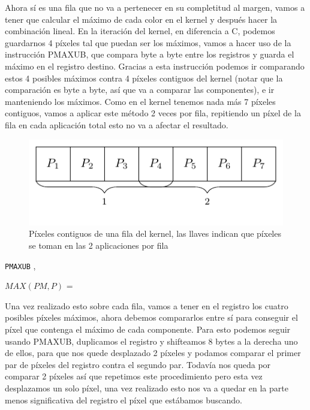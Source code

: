 Ahora sí es una fila que no va a pertenecer en su completitud al margen, vamos a tener que calcular el máximo de cada color en el kernel y después hacer la combinación lineal. En la iteración del kernel, en diferencia a C, podemos guardarnos 4 píxeles tal que puedan ser los máximos, vamos a hacer uso de la instrucción PMAXUB, que compara byte a byte entre los registros y guarda el máximo en el registro destino. Gracias a esta instrucción podemos ir comparando estos 4 posibles máximos contra 4 píxeles contiguos del kernel (notar que la comparación es byte a byte, así que va a comparar las componentes), e ir manteniendo los máximos. Como en el kernel tenemos nada más 7 píxeles contiguos, vamos a aplicar este método 2 veces por fila, repitiendo un píxel de la fila en cada aplicación total esto no va a afectar el resultado.

\begin{figure}[H]
	\centering
	\includegraphics{img/max/filaKernel.pdf}
	\caption{Píxeles contiguos de una fila del kernel, las llaves indican que píxeles se toman en las 2 aplicaciones por fila}
\end{figure}

\begin{center}

	 

	 

	\texttt{PMAXUB} ,  \hfill

	 

	$MAX(PM,P)$ = 
\end{center}

Una vez realizado esto sobre cada fila, vamos a tener en el registro los cuatro posibles píxeles máximos, ahora debemos compararlos entre sí para conseguir el píxel que contenga el máximo de cada componente. Para esto podemos seguir usando PMAXUB, duplicamos el registro y shifteamos 8 bytes a la derecha uno de ellos, para que nos quede desplazado 2 píxeles y podamos comparar el primer par de píxeles del registro contra el segundo par. Todavía nos queda por comparar 2 píxeles así que repetimos este procedimiento pero esta vez desplazamos un solo píxel, una vez realizado esto nos va a quedar en la parte menos significativa del registro el píxel que estábamos buscando.

